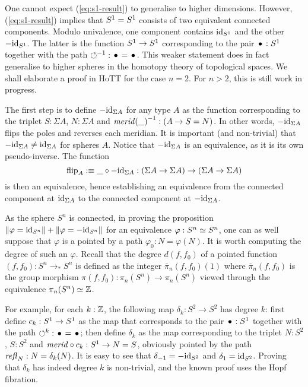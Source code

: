 \documentclass{easychair}
\newcommand{\Sp}{{S^2}}%
\newcommand{\Sn}{{S^n}}%
\newcommand{\mrd}{\mathit{merid}}%
\newcommand{\susp}[1]{\Sigma{#1}}%
\newcommand{\ptdto}{\to_\ast}%
\newcommand{\flip}{\operatorname{flip}}%
\def\blank{\_}%
\begin{document}
One cannot expect (\ref{eq:s1-result}) to generalise to higher
dimensions. However, (\ref{eq:s1-result}) implies that ${S^1} = {S^1}$
consists of two equivalent connected components. Modulo univalence,
one component contains $\mathord{\mathrm{id}}_{S^1}$ and the other $-\mathord{\mathrm{id}}_{S^1}$. The latter
is the function ${S^1} \to {S^1}$ corresponding to the pair $\base:\Sc$
together with the path $\inv\Sloop:\base=\base$. This weaker statement
does in fact generalise to higher spheres in the homotopy theory of
topological spaces. We shall elaborate a proof in HoTT for the case
$n=2$. For $n>2$, this is still work in progress.

The first step is to define $-\id_{\susp A}$ for any type $A$ as the
function corresponding to the triplet $S:\susp A$, $N:\susp A$ and
$\inv{\mrd(\blank)} : (A \to S=N)$. In other words, $-\id_{\susp A}$
flips the poles and reverses each meridian. It is important (and non-trivial)
that $-\id_{\susp A} \neq \id_{\susp A}$ for spheres $A$.  Notice that
$-\id_{\susp A}$ is an equivalence, as it is its own
pseudo-inverse. The function
\begin{displaymath}
  \flip_A \defequi \blank \circ -\id_{\susp A} : (\susp A \to \susp A) \to (\susp A \to \susp A)
\end{displaymath}
is then an equivalence, hence establishing an equivalence from the
connected component at $\id_{\susp A}$ to the connected component at
$-\id_{\susp A}$.

As the sphere $S^n$ is connected, in proving the proposition
$\Trunc{\varphi=\id_\Sn}+\Trunc{\varphi=-\id_\Sn}$ for an equivalence
$\varphi:\Sn \weq \Sn$, one can as well suppose that $\varphi$ is a
pointed by a path $\varphi_0:N=\varphi(N)$. It is worth computing the
degree of such an $\varphi$. Recall that the degree $d(f,f_0)$ of a
pointed function $(f,f_0):\Sn \ptdto\Sn$ is defined as the integer
$\bar \pi_n(f,f_0)(1)$ where $\bar\pi_n(f,f_0)$ is the group morphism
$\pi(f,f_0) : \pi_n(\Sn) \to \pi_n(\Sn)$ viewed through the
equivalence $\pi_n(\Sn) \weq \ZZ$.

For example, for each $k:\mathbb{Z}$, the
following map $\delta_k : \Sp \to \Sp$ has degree $k$: first define
$c_k:{S^1}\to{S^1}$ as the map that corresponds to the pair $\base:\Sc$
together with the path $\Sloop^k:\base=\base$; then define $\delta_k$
as the map corresponding to the triplet $N:\Sp$, $S:\Sp$ and
$\mrd\circ c_k: \Sc \to N=S$, obviously pointed by the path
$\mathop{{\mathit{refl}}_{N}}:N=\delta_k(N)$. 
It is easy to see that $\delta_{-1} = -\id_{\Sp}$   and $\delta_1 = \id_{\Sp}$.
Proving that $\delta_k$ has indeed degree $k$ is non-trivial, and the known
proof uses the Hopf fibration.
\end{document}
